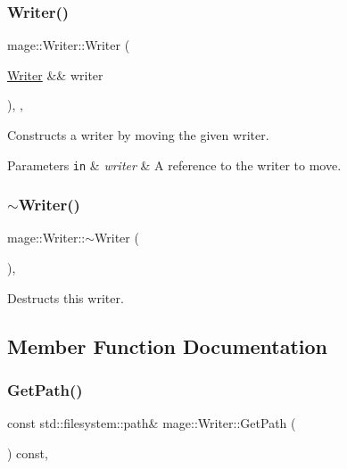 \subsubsection{\texorpdfstring{Writer()}{Writer()}\hspace{0.1cm}{\footnotesize\ttfamily [3/3]}}
{\footnotesize\ttfamily mage\+::\+Writer\+::\+Writer (\begin{DoxyParamCaption}\item[{\mbox{\hyperlink{classmage_1_1_writer}{Writer}} \&\&}]{writer }\end{DoxyParamCaption})\hspace{0.3cm}{\ttfamily [protected]}, {\ttfamily [default]}, {\ttfamily [noexcept]}}

Constructs a writer by moving the given writer.


\begin{DoxyParams}[1]{Parameters}
\mbox{\tt in}  & {\em writer} & A reference to the writer to move. \\
\hline
\end{DoxyParams}
\mbox{\label{classmage_1_1_writer_aeeb30d6afb1a271b4ad294889054caec}} 
\subsubsection{\texorpdfstring{$\sim$\+Writer()}{~Writer()}}
{\footnotesize\ttfamily mage\+::\+Writer\+::$\sim$\+Writer (\begin{DoxyParamCaption}{ }\end{DoxyParamCaption})\hspace{0.3cm}{\ttfamily [protected]}, {\ttfamily [default]}}

Destructs this writer. 

\subsection{Member Function Documentation}
\mbox{\label{classmage_1_1_writer_ab023ae8174132f233c6e1fa4d3a2a1c8}} 
\subsubsection{\texorpdfstring{Get\+Path()}{GetPath()}}
{\footnotesize\ttfamily const std\+::filesystem\+::path\& mage\+::\+Writer\+::\+Get\+Path (\begin{DoxyParamCaption}{ }\end{DoxyParamCaption}) const\hspace{0.3cm}{\ttfamily [protected]}, {\ttfamily [noexcept]}}

